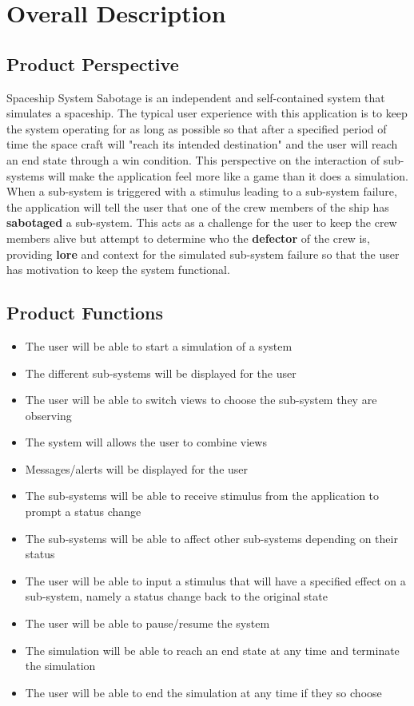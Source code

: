 \documentclass[12pt, titlepage]{article}
\newcommand\tab[1][1cm]{\hspace*{#1}}
\begin{document}

\section{Overall Description}
\subsection{Product Perspective}
\tab Spaceship System Sabotage is an independent and self-contained system that simulates a spaceship. The typical user experience with this application is to keep the system operating for as long as possible so that after a specified period of time the space craft will "reach its intended destination" and the user will reach an end state through a win condition. This perspective on the interaction of sub-systems will make the application feel more like a game than it does a simulation. When a sub-system is triggered with a stimulus leading to a sub-system failure, the application will tell the user that one of the crew members of the ship has  \textbf{sabotaged} a sub-system. This acts as a challenge for the user to keep the crew members alive but attempt to determine who the \textbf{defector} of the crew is, providing  \textbf{lore} and context for the simulated sub-system failure so that the user has motivation to keep the system functional.

\subsection{Product Functions}
\begin{itemize}
\item The user will be able to start a simulation of a system
\item The different sub-systems will be displayed for the user
\item The user will be able to switch views to choose the sub-system they are observing
\item The system will allows the user to combine views
\item Messages/alerts will be displayed for the user
\item The sub-systems will be able to receive stimulus from the application to prompt a status change
\item The sub-systems will be able to affect other sub-systems depending on their status
\item The user will be able to input a stimulus that will have a specified effect on a sub-system, namely a status change back to the original state
\item The user will be able to pause/resume the system
\item The simulation will be able to reach an end state at any time and terminate the simulation
\item The user will be able to end the simulation at any time if they so choose
\end{itemize}
\end{document}

